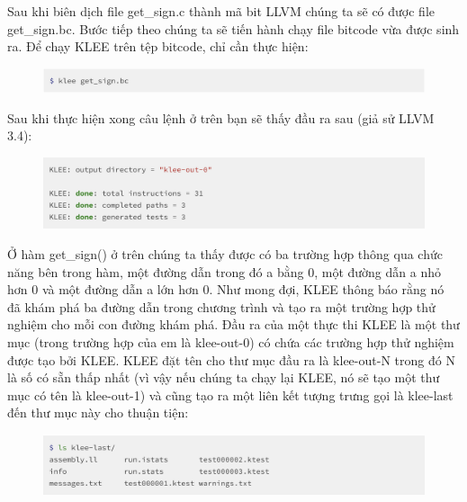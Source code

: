 \documentclass[12pt,a4paper]{report}
\begin{document}
Sau khi biên dịch file get\_sign.c thành mã bit LLVM chúng ta sẽ có được file get\_sign.bc. Bước tiếp theo chúng ta sẽ tiến hành chạy file bitcode vừa được sinh ra. Để chạy KLEE trên tệp bitcode, chỉ cần thực hiện:

\begin{figure}[ht]
\begin{center}
\includegraphics[scale=.3]{hinhanh/runningklee.png}
\end{center}
\end{figure}

Sau khi thực hiện xong câu lệnh ở trên bạn sẽ thấy đầu ra sau (giả sử LLVM 3.4):

\begin{figure}[ht]
\begin{center}
\includegraphics[scale=.3]{hinhanh/outputklee.png}
\end{center}
\end{figure}

Ở hàm get\_sign() ở trên chúng ta thấy được có  ba trường hợp thông qua chức năng bên trong hàm, một đường dẫn trong đó a bằng 0, một đường dẫn a nhỏ hơn 0 và một đường dẫn a lớn hơn 0. Như mong đợi, KLEE thông báo rằng nó đã khám phá ba đường dẫn trong chương trình và tạo ra một trường hợp thử nghiệm cho mỗi con đường khám phá. Đầu ra của một thực thi KLEE là một thư mục (trong trường hợp của em là klee-out-0) có chứa các trường hợp thử nghiệm được tạo bởi KLEE. KLEE đặt tên cho thư mục đầu ra là klee-out-N trong đó N là số có sẵn thấp nhất (vì vậy nếu chúng ta chạy lại KLEE, nó sẽ tạo một thư mục có tên là klee-out-1) và cũng tạo ra một liên kết tượng trưng gọi là klee-last đến thư mục này cho thuận tiện:

\begin{figure}[ht]
\begin{center}
\includegraphics[scale=.3]{hinhanh/outputfolder.png}
\end{center}
\end{figure}
\end{document}
